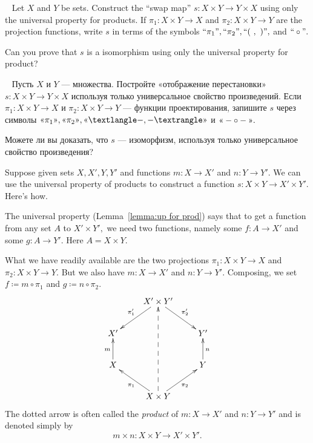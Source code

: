 \documentclass[../main/CT4S-EN-RU]{subfiles}
\begin{document}
\begin{exerciseENG}~
\sexc Let $X$ and $Y$ be sets. Construct the “swap map” $s\colon X\times Y{→} Y\times X$ using only the universal property for products. If $\pi_1\colon X\times Y{→} X$ and $\pi_2\colon X\times Y{→} Y$ are the projection functions, write $s$ in terms of the symbols $\qtE{\pi_1}, \qtE{\pi_2}, \qtE{(\ ,\ )},$ and $\qtE{\circ}.$ 
\item Can you prove that $s$ is a isomorphism using only the universal property for product?
\endsexc
\end{exerciseENG}

\begin{exerciseRUS}~
\sexc Пусть $X$ и $Y$ — множества. Постройте «отображение перестановки» $s\colon X\times Y{→} Y\times X$ используя только универсальное свойство произведений. Если $\pi_1\colon X\times Y{→} X$ и $\pi_2\colon X\times Y{→} Y$ — функции проектирования, запишите $s$ через символы $\qtR{\pi_1}, \qtR{\pi_2}, \qtR{\prodmap{-}{-}}$ и $\qtR{- \circ -}.$ 
\item Можете ли вы доказать, что $s$ — изоморфизм, используя только универсальное свойство произведения?
\endsexc
\end{exerciseRUS}

\begin{exampleENG}\label{ex:product to product}
Suppose given sets $X,X', Y, Y'$ and functions $m\colon X{→} X'$ and $n\colon Y{→} Y'.$ We can use the universal property of products to construct a function $s\colon X\times Y{→} X'\times Y'.$  Here's how.

The universal property (Lemma~\ref{lemma:up for prod}) says that to get a function from any set $A$ to $X'\times Y',$ we need two functions, namely some $f\colon A{→} X'$ and some $g\colon A{→} Y'.$ Here $A=X\times Y.$ 

What we have readily available are the two projections $\pi_1\colon X\times Y{→} X$ and $\pi_2\colon X\times Y{→} Y.$ But we also have $m\colon X{→} X'$ and $n\colon Y{→} Y'.$ Composing, we set $f{\coloneqq}m\circ \pi_1$ and $g{\coloneqq}n\circ\pi_2.$
$$\xymatrix{
&X'\times Y'\ar[dl]_{\pi_1'}\ar[dr]^{\pi_2'}\\
X'&&Y'\\
X\ar[u]^m&&Y\ar[u]_n\\
&X\times Y\ar[ul]^{\pi_1}\ar[ur]_{\pi_2}\ar@{-->}[uuu]
}
$$
The dotted arrow is often called the {\em product} of $m\colon X{→} X'$ and $n\colon Y{→} Y'$ and is denoted simply by 
$$m\times n\colon X\times Y{→} X'\times Y'.$$
\end{exampleENG}
\end{document}
